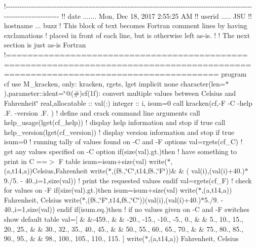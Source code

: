 !-\/-\/-\/-\/-\/-\/-\/-\/-\/-\/-\/-\/-\/-\/-\/-\/-\/-\/-\/-\/-\/-\/-\/-\/-\/-\/-\/-\/-\/-\/-\/-\/-\/-\/-\/-\/-\/-\/-\/-\/-\/-\/-\/-\/-\/-\/-\/-\/-\/-\/-\/-\/-\/-\/-\/-\/-\/-\/-\/-\/-\/-\/-\/-\/-\/-\/-\/-\/-\/-\/-\/-\/-\/-\/-\/-\/-\/-\/-\/-\/-\/-\/-\/-\/-\/-\/-\/-\/-\/-\/-\/-\/-\/-\/-\/-\/-\/-\/-\/-\/-\/-\/-\/-\/-\/-\/-\/-\/-\/-\/-\/-\/-\/-\/-\/-\/-\/-\/-\/-\/-\/-\/-\/-\/-\/-\/-\/-\/-\/-\/-\/ !! date ....... Mon, Dec 18, 2017 2\+:55\+:25 A\+M !! userid ..... J\+S\+U !! hostname ... buzz ! This block of text becomes Fortran comment lines by having exclamations ! placed in front of each line, but is otherwise left as-\/is. ! ! The next section is just as-\/is Fortran !=================================================================================================================================== program cf use M\+\_\+kracken, only\+: kracken, rgets, lget implicit none character(len=$\ast$),parameter\+::ident=\char`\"{}@(\#)cf(1f)\+: convert multiple values between Celsius and Fahrenheit\char`\"{} real,allocatable \+:: val(\+:) integer \+:: i, isum=0 call kracken(\textquotesingle{}cf\textquotesingle{},\textquotesingle{}-\/\+F -\/\+C -\/help .\+F. -\/version .\+F.\textquotesingle{} ) ! define and crack command line arguments call help\+\_\+usage(lget(\textquotesingle{}cf\+\_\+help\textquotesingle{})) ! display help information and stop if true call help\+\_\+version(lget(\textquotesingle{}cf\+\_\+version\textquotesingle{})) ! display version information and stop if true isum=0 ! running tally of values found on -\/\+C and -\/\+F options val=rgets(\textquotesingle{}cf\+\_\+\+C\textquotesingle{}) ! get any values specified on -\/\+C option if(size(val).\+gt.)then ! have something to print in C ==$>$ F table isum=isum+size(val) write($\ast$,\textquotesingle{}(a,t14,a)\textquotesingle{})\textquotesingle{}\+Celsius\textquotesingle{},\textquotesingle{}\+Fahrenheit\textquotesingle{} write($\ast$,\textquotesingle{}(f8.,\char`\"{}\+C\char`\"{},t14,f8.,\char`\"{}\+F\char`\"{})\textquotesingle{})\& \& ( val(i),(val(i)+40.)$\ast$9./5. -\/ 40.,i=1,size(val)) ! print the requested values endif val=rgets(\textquotesingle{}cf\+\_\+\+F\textquotesingle{}) ! check for values on -\/\+F if(size(val).\+gt.)then isum=isum+size(val) write($\ast$,\textquotesingle{}(a,t14,a)\textquotesingle{}) \textquotesingle{}\+Fahrenheit\textquotesingle{}, \textquotesingle{}\+Celsius\textquotesingle{} write($\ast$,\textquotesingle{}(f8.,\char`\"{}\+F\char`\"{},t14,f8.,\char`\"{}\+C\char`\"{})\textquotesingle{})(val(i),(val(i)+40.)$\ast$5./9. -\/ 40.,i=1,size(val)) endif if(isum.\+eq.)then ! if no values given on -\/\+C and -\/\+F switches show default table val=\mbox{[} \& \&-\/459., \& \& -\/20., -\/15., -\/10., -\/5., 0., \& \& 5., 10., 15., 20., 25., \& \& 30., 32., 35., 40., 45., \& \& 50., 55., 60., 65., 70., \& \& 75., 80., 85., 90., 95., \& \& 98., 100., 105., 110., 115. \mbox{]} write($\ast$,\textquotesingle{}(a,t14,a)\textquotesingle{}) \textquotesingle{}\+Fahrenheit\textquotesingle{}, \textquotesingle{}\+Celsius\textquotesingle{} 